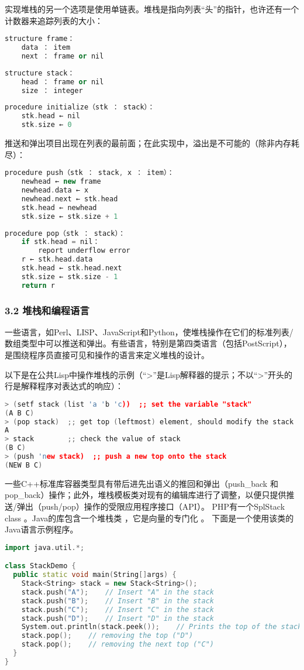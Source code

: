 实现堆栈的另一个选项是使用单链表。堆栈是指向列表“头”的指针，也许还有一个计数器来追踪列表的大小：
\begin{lstlisting}[language=cpp]
structure frame：
    data ： item
    next ： frame or nil
\end{lstlisting}
\begin{lstlisting}[language=cpp]
structure stack：
    head ： frame or nil
    size ： integer
\end{lstlisting}
\begin{lstlisting}[language=cpp]
procedure initialize（stk ： stack）：
    stk.head ← nil
    stk.size ← 0
\end{lstlisting}
推送和弹出项目出现在列表的最前面；在此实现中，溢出是不可能的（除非内存耗尽）：
\begin{lstlisting}[language=cpp]
procedure push（stk ： stack, x ： item）：
    newhead ← new frame
    newhead.data ← x
    newhead.next ← stk.head
    stk.head ← newhead
    stk.size ← stk.size + 1
\end{lstlisting}
\begin{lstlisting}[language=cpp]
procedure pop（stk ： stack）：
    if stk.head = nil：
        report underflow error
    r ← stk.head.data
    stk.head ← stk.head.next
    stk.size ← stk.size - 1
    return r
\end{lstlisting}

\subsubsection{3.2 堆栈和编程语言}
一些语言，如Perl、LISP、JavaScript和Python，使堆栈操作在它们的标准列表/数组类型中可以推送和弹出。有些语言，特别是第四类语言（包括PostScript），是围绕程序员直接可见和操作的语言来定义堆栈的设计。

以下是在公共Lisp中操作堆栈的示例（“>”是Lisp解释器的提示；不以“>”开头的行是解释程序对表达式的响应）：
\begin{lstlisting}[language=cpp]
> (setf stack (list 'a 'b 'c))  ;; set the variable "stack"
(A B C)
> (pop stack)  ;; get top (leftmost) element, should modify the stack
A
> stack        ;; check the value of stack
(B C)
> (push 'new stack)  ;; push a new top onto the stack
(NEW B C)
\end{lstlisting}
一些C++标准库容器类型具有带后进先出语义的推回和弹出（push_back 和 pop_back）操作；此外，堆栈模板类对现有的编辑库进行了调整，以便只提供推送/弹出（push/pop）操作的受限应用程序接口（API）。 PHP有一个SplStack class 。Java的库包含一个堆栈类 ，它是向量的专门化 。 下面是一个使用该类的Java语言示例程序。
\begin{lstlisting}[language=cpp]
import java.util.*;

class StackDemo {
  public static void main(String[]args) {
    Stack<String> stack = new Stack<String>();
    stack.push("A");    // Insert "A" in the stack
    stack.push("B");    // Insert "B" in the stack
    stack.push("C");    // Insert "C" in the stack
    stack.push("D");    // Insert "D" in the stack
    System.out.println(stack.peek());    // Prints the top of the stack ("D")
    stack.pop();    // removing the top ("D")
    stack.pop();    // removing the next top ("C")
  }
}
\end{lstlisting}

